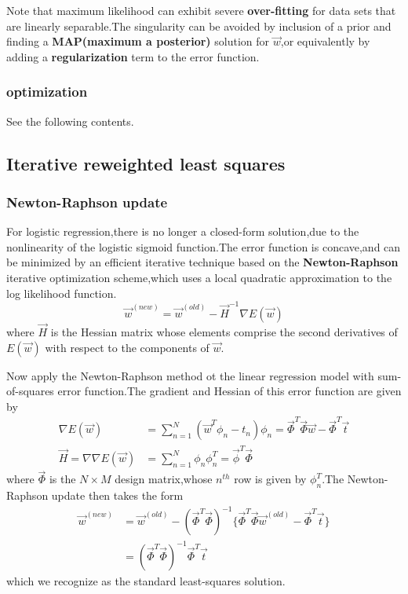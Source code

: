 Note that maximum likelihood can exhibit severe \textbf{over-fitting} for data sets that are linearly separable.The singularity can be avoided by inclusion of a prior and finding a \textbf{MAP(maximum a posterior)} solution for $\vec{w}$,or equivalently by adding a \textbf{regularization} term to the error function.



\subsubsection{optimization}
See the following contents.
\subsection{Iterative reweighted least squares}
\subsubsection{Newton-Raphson update}
For logistic regression,there is no longer a closed-form solution,due to the nonlinearity of the logistic sigmoid function.The error function is concave,and can be minimized by an efficient iterative technique based on the \textbf{Newton-Raphson} iterative optimization scheme,which  uses a local quadratic approximation to the log likelihood function.
\begin{equation}
\vec{w}^{(new)} = \vec{w}^{(old)}-\vec{H}^{-1}\nabla E(\vec{w})
\end{equation}
where $\vec{H}$ is the Hessian matrix whose elements comprise the second derivatives of $E(\vec{w})$ with respect to the components of $\vec{w}$.

Now apply the Newton-Raphson method ot the linear regression model with sum-of-squares error function.The gradient and Hessian of this error function are given by
\begin{align}
\nabla E(\vec{w}) &= \sum_{n=1}^{N}(\vec{w}^T\phi_n-t_n)\phi_n = \vec{\Phi}^T\vec{\Phi}\vec{w} - \vec{\Phi}^T\vec{t} \\
\vec{H} = \nabla\nabla E(\vec{w}) &= \sum_{n=1}^{N}\phi_n\phi_n^T=\vec{\phi}^T\vec{\Phi}
\end{align}
where $\vec{\Phi}$ is the $N\times M$ design matrix,whose $n^{th}$ row is given by $\phi_n^T$.The Newton-Raphson update then takes the form
\begin{align}
\vec{w}^{(new)} &= \vec{w}^{(old)} -(\vec{\Phi}^T\vec{\Phi})^{-1}\{\vec{\Phi}^T\vec{\Phi}\vec{w}^{(old)} -\vec{\Phi}^T\vec{t} \} \\
&=(\vec{\Phi}^T\vec{\Phi})^{-1}\vec{\Phi}^T\vec{t}
\end{align}
which we recognize as the standard least-squares solution.

